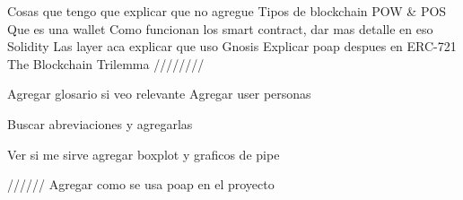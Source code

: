 Cosas que tengo que explicar que no agregue
Tipos de blockchain 
POW & POS
Que es una wallet
Como funcionan los smart contract, dar mas detalle en eso
Solidity
Las layer
aca explicar que uso Gnosis
Explicar poap despues en ERC-721
The Blockchain Trilemma
////////

Agregar glosario si veo relevante
Agregar user personas

Buscar abreviaciones y agregarlas


Ver si me sirve agregar boxplot
y graficos de pipe


//////
Agregar como se usa poap en el proyecto